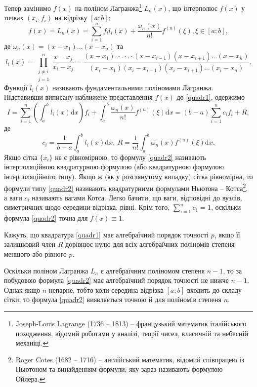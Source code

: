\documentclass[14pt,twoside]{extreport}
\theoremstyle{mystyle}
\numberwithin{equation}{chapter}
\begin{document}
Тепер замінимо $f(x)$ на поліном Лагранжа\footnote{Joseph-Louis Lagrange (1736 -- 1813) -- французький математик італійського походження, відомий роботами у аналізі, теорії чисел, класичній та небесній механіці.} $L_n(x)$, що інтерполює $f(x)$ у точках $(x_i, f_i)$ на відрізку $[a; b]$:
\[
f(x)=L_{n}(x)=\sum_{i=1}^{n}f_{i}l_{i}(x)+\frac{\omega_{n}(x)}{n!}f^{(n)}(\xi), \xi\in[a; b],
\]
де $\omega_{n}(x)=(x-x_{1})\ldots(x-x_{n})$ та
\[
l_{i}(x) = \displaystyle \prod\limits_{\substack{
	j\neq i\\
	j=1}}^{n}\frac{x-x_{j}}{x_{i}-x_{j}}=\frac{(x-x_{1}).\cdot.\cdot.\cdot(x-x_{i-1})(x-x_{i+1})\ldots(x-x_{n})}{(x_{i}-x_{1})(x_{i}-x_{i-1})(x_{i}-x_{i+1})\ldots(x_{i}-x_{n})}.
\]
Функції $l_i(x)$ називають фундаментальними поліномами Лагранжа. Підставивши виписану наближене представлення $f(x)$ до \eqref{quadr1}, одержимо
\begin{equation}\label{quadr2}
I = \displaystyle \sum_{i=1}^{n}\left(\int_{a}^{b}l_{i}(x)\mathrm{d}x\right)f_{i}+\int_{a}^{b}\frac{\omega_{n}(x)}{n!}f^{(n)}(\xi)\mathrm{d}x= (b-a)\sum_{i=1}^{n}c_{i}f_{i}+R,
\end{equation}
де
\[
c_{i}=\frac{1}{b-a}\int_{a}^{b}l_{i}(x)\mathrm{d}x,\ R=\frac{1}{n!}\int_{a}^{b}\omega_{n}(x)f^{(n)}(\xi)\mathrm{d}x.
\]
Якщо сітка $\{x_i\}$ не є рівномірною, то формулу \eqref{quadr2} називають інтерполяційною квадратурною формулою (або квадратурною формулою інтерполяційного типу). Якщо ж (як у розглянутому випадку) сітка рівномірна, то формули типу \eqref{quadr2} називають квадратурними формулами Ньютона -- Котса\footnote{Roger Cotes (1682 -- 1716) -- англійський математик, відомий співпрацею із Ньютоном та винайденням формули, яку зараз називають формулою Ойлера.}, а ваги $c_i$ називають вагами Котса. Легко бачити, що ваги, відповідні до вузлів, симетричних щодо середини відрізка, рівні. Крім того, $\displaystyle \sum_{i=1}^{n} c_1 = 1$, оскільки формула \eqref{quadr2} точна для $f(x) \equiv 1$.

Кажуть, що квадратура \eqref{quadr1} має алгебраїчний порядок точності $p$, якщо її залишковий член $R$ дорівнює нулю для всіх алгебраїчних поліномів степеня меншого або рівного $p$.

Оскільки поліном Лагранжа $L_n$ є алгебраїчним поліномом степеня $n-1$, то за побудовою формула \eqref{quadr2} має алгебраїчний порядок точності не нижче $n-1$. Однак якщо $n$ непарне, тобто коли середина відрізка $[a; b]$ входить до складу сітки, то формула \eqref{quadr2} виявляється точною й для поліномів степеня $n$.
\end{document}
